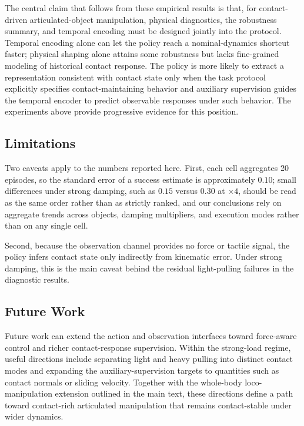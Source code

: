 \documentclass{llmxive}
\begin{document}
The central claim that follows from these empirical results is that,
for contact-driven articulated-object manipulation, physical
diagnostics, the robustness summary, and temporal encoding must be
designed jointly into the protocol. Temporal encoding alone can let
the policy reach a nominal-dynamics shortcut faster; physical shaping
alone attains some robustness but lacks fine-grained modeling of
historical contact response. The policy is more likely to extract a
representation consistent with contact state only when the task
protocol explicitly specifies contact-maintaining behavior
and auxiliary supervision guides the temporal encoder to predict
observable responses under such behavior. The experiments above
provide progressive evidence for this position.


\subsection{Limitations}
\label{sec:limits}

Two caveats apply to the numbers reported here. First, each cell
aggregates 20 episodes, so the standard error of a success estimate is
approximately $0.10$; small differences under strong damping, such as
$0.15$ versus $0.30$ at $\times4$, should be read as the same order
rather than as strictly ranked, and our conclusions rely on aggregate
trends across objects, damping multipliers, and execution modes rather
than on any single cell.

Second, because the observation channel provides no force or tactile
signal, the policy infers contact state only indirectly from
kinematic error. Under strong damping, this is the main caveat behind
the residual light-pulling failures in the diagnostic results.


\subsection{Future Work}
\label{sec:additional_future_work}

Future work can extend the action and observation interfaces toward
force-aware control and richer contact-response supervision. Within
the strong-load regime, useful directions include separating light and
heavy pulling into distinct contact modes and expanding the
auxiliary-supervision targets to quantities such as contact normals or
sliding velocity. Together with the whole-body loco-manipulation
extension outlined in the main text, these directions define a path
toward contact-rich articulated manipulation that remains
contact-stable under wider dynamics.
\end{document}
